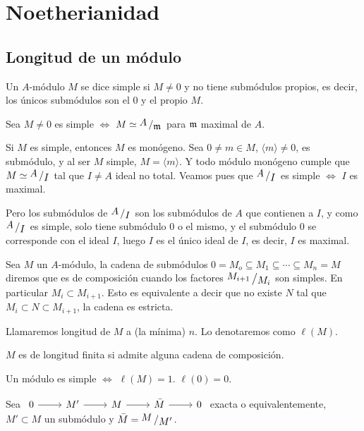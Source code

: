 \chapter{Noetherianidad}
\section{Longitud de un m\'odulo}
\begin{defi}
    Un $A$-m\'odulo $M$ se dice simple si $M\neq 0$ y no tiene subm\'odulos propios, es decir, los \'unicos subm\'odulos son el 0 y el propio $M$.
\end{defi}
\begin{prop}
    Sea $M\neq 0$ es simple $\iff$ $M \simeq \modulo{A}{\m}$ para $\mathfrak{m}$ maximal de $A$. 
\end{prop}
\begin{dem}
    Si $M$ es simple, entonces $M$ es mon\'ogeno. Sea $0 \neq m \in M$, $\langle m\rangle \neq 0$, es subm\'odulo, y al ser $M$ simple, $M = \langle m \rangle$. Y todo m\'odulo mon\'ogeno cumple que $M\simeq \modulo{A}{I}$ tal que $I \neq A$ ideal no total. Veamos pues que $\modulo{A}{I}$ es simple $\iff$ $I$ es maximal.

    Pero los subm\'odulos de $\modulo{A}{I}$ son los subm\'odulos de $A$ que contienen a $I$, y como $\modulo{A}{I}$ es simple, solo tiene subm\'odulo 0 o el mismo, y el subm\'odulo 0 se corresponde con el ideal $I$, luego $I$ es el \'unico ideal de $I$, es decir, $I$ es maximal. 
\end{dem}
\begin{defi}
    Sea $M$ un $A$-m\'odulo, la cadena de subm\'odulos $ 0 = M_o \subseteq M_1 \subseteq \cdots \subseteq M_n = M$ diremos que es de composici\'on cuando los factores $\modulo{M_{i+1}}{M_i}$ son simples. En particular $M_i \subset M_{i+1}$. Esto es equivalente a decir que no existe $N$ tal que $M_i \subset N \subset M_{i+1}$, la cadena es estricta. 
\end{defi}
\begin{defi}
    Llamaremos longitud de $M$ a (la m\'inima) $n$. Lo denotaremos como $\ell(M)$.
\end{defi}
\begin{defi}
    $M$ es de longitud finita si admite alguna cadena de composici\'on. 
\end{defi}
\begin{ejer}
 [elemental] Un m\'odulo es simple $\iff$ $\ell(M) = 1$. $\ell(0)=0$. 
\end{ejer}
Sea $\bt 0\rar & M' \rar & M \rar & \bar M \rar & 0 \et$ exacta o equivalentemente, $M'\subset M$ un subm\'odulo y $\bar M = \modulo{M}{M'}$.
